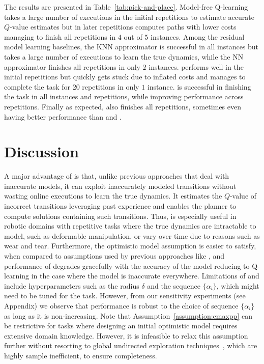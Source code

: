 The results are presented in Table~\ref{tab:pick-and-place}. 
Model-free Q-learning takes a large number of executions in the
initial repetitions to estimate accurate $Q$-value estimates but in
later repetitions computes paths with lower costs managing to finish all
repetitions in $4$ out of $5$ instances. Among the residual model
learning baselines, the KNN approximator is successful in all
instances but takes a large number of executions to learn the true
dynamics, while the NN approximator finishes all repetitions in only
$2$ instances. \cmax{} performs well in the initial repetitions but
quickly gets stuck due to inflated costs and manages to complete the
task for $20$ repetitions in only $1$ instance. \cmaxpp{} is successful in
finishing the 
task in all instances and repetitions, while improving performance
across repetitions. Finally as expected, \acmaxpp{} also finishes all
repetitions, sometimes even having better performance than \cmax{} and
\cmaxpp{}.



\section{Discussion}
\label{sec:disc-concl}

A major advantage of \cmaxpp{} is that, unlike previous approaches
that deal with inaccurate models, it can exploit inaccurately modeled
transitions without wasting online executions to learn the true
dynamics. It estimates the $Q$-value of incorrect transitions
leveraging past experience and enables the planner to compute solutions
containing such transitions. Thus, \cmaxpp{} is especially useful in
robotic domains with repetitive tasks where the true dynamics are
intractable to model, such as deformable manipulation, or vary
over time due to reasons such as wear and tear. Furthermore, the optimistic model assumption is
easier to satisfy, when compared to assumptions used by previous
approaches like \cmax{}, and performance of \cmaxpp{} degrades
gracefully with the accuracy of the model reducing to Q-learning in
the case where the model is inaccurate everywhere.
Limitations of
\cmaxpp{} and \acmaxpp{} include hyperparameters such as the
radius $\delta$ and the sequence $\{\alpha_i\}$, which might need to
be tuned for the task.
However, from our sensitivity experiments (see Appendix) we observe
that \acmaxpp{} performance is robust to the choice of sequence
$\{\alpha_i\}$ as long as it is non-increasing.
Note that Assumption~\ref{assumption:cmaxpp} can
be restrictive for tasks where designing an initial optimistic
model requires extensive domain
knowledge. However, it is infeasible to relax this assumption further
without resorting to global undirected exploration
techniques~\cite{Thrun-1992-15850}, which are highly sample
inefficient, to ensure completeness.

